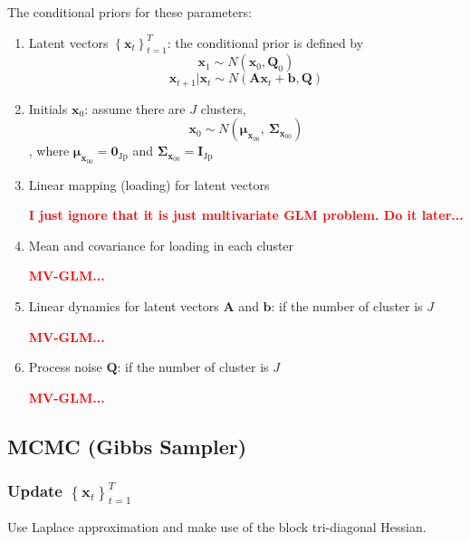 \documentclass[]{article}
\begin{document}
The conditional priors for these parameters:
\begin{enumerate}
	\def\labelenumi{(\arabic{enumi})}
	\item
	Latent vectors \(\left\{ \mathbf{x}_{t} \right\}_{t=1}^T\): the conditional prior is
	defined by
	\[\mathbf{x}_{1} \sim N(\mathbf{x}_{0},\mathbf{Q}_{0})\]
	\[\mathbf{x}_{t + 1}|\mathbf{x}_{t} \sim N(\mathbf{A}\mathbf{x}_{t} + \mathbf{b},\mathbf{Q})\]
	\item
	Initials \(\mathbf{x}_{0}\): assume there are \(J\) clusters,
	\[\mathbf{x}_{0} \sim N(\bm{\mu}_{\mathbf{x}_{00}},\ \mathbf{\Sigma}_{\mathbf{x}_{00}})\]
	, where \(\bm{\mu}_{\mathbf{x}_{00}} = \mathbf{0}_{\text{Jp}}\) and \(\mathbf{\Sigma}_{\mathbf{x}_{00}} = \mathbf{I}_{\text{Jp}}\)
	\item
	Linear mapping (loading) for latent vectors
	
	\textcolor{red}{\textbf{I just ignore that it is just multivariate GLM problem. Do it later...}}\\
	
	\item
	Mean and covariance for loading in each cluster
	
	\textcolor{red}{\textbf{MV-GLM...}}\\
	
	\item
	Linear dynamics for latent vectors \(\mathbf{A}\) and \(\mathbf{b}\): if the number of cluster is \(J\)
	
	\textcolor{red}{\textbf{MV-GLM...}}\\
	
	\item
	Process noise \(\mathbf{Q}\): if the number of cluster is \(J\)
	
	\textcolor{red}{\textbf{MV-GLM...}}\\
	
\end{enumerate}

\subsection{MCMC (Gibbs Sampler)}

\subsubsection{Update \(\left\{ \mathbf{x}_{t} \right\}_{t=1}^T\)}
Use Laplace approximation and make use of the block tri-diagonal Hessian.
\end{document}
